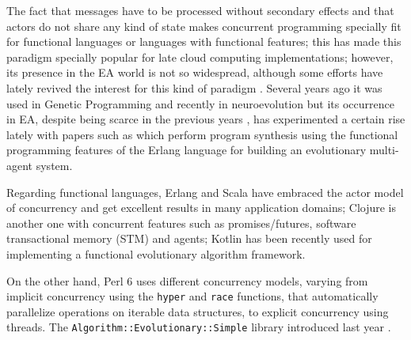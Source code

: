 \documentclass[sigconf]{acmart}\usepackage[]{graphicx}\usepackage[]{color}
\begin{document}

The fact that messages have to be processed without secondary effects
and that actors do not share any kind of state makes concurrent
programming specially fit for functional languages or languages with
functional features; this has made this paradigm specially popular for
late cloud computing implementations; however, its presence in the EA
world is not so widespread, although some efforts have lately revived
the interest for this kind of paradigm \cite{swan2015research}.
Several years ago it was used in Genetic Programming
\cite{Briggs:2008:FGP:1375341.1375345,Huelsbergen:1996:TSE:1595536.1595579,walsh:1999:AFSFESIHLP}
and recently in neuroevolution \cite{Sher2013} but its occurrence in EA,
despite being scarce in the previous years
\cite{Hawkins:2001:GFG:872017.872197}, has experimented a certain rise
lately with papers such as \cite{valkov2018synthesis} which perform
program synthesis using the functional programming features of the Erlang language
\cite{barwell2017using} for building an evolutionary multi-agent system.

Regarding functional languages, Erlang and Scala have
embraced the actor model of concurrency and get excellent results in
many application domains; Clojure is another one with concurrent
features such as promises/futures, software transactional memory (STM) 
and agents; Kotlin \cite{simson2017open} has been recently used for
implementing a functional evolutionary algorithm framework.  

On the
other hand, Perl 6 \cite{Tang:2007:PRI:1190216.1190218,lenzperl} 
uses different concurrency models, varying from implicit concurrency 
using the {\tt hyper} and {\tt race} functions, that automatically 
parallelize operations on iterable data structures, to explicit 
concurrency using threads. 
The {\tt Algorithm::Evolutionary::Simple} library introduced last year
.
\end{document}
